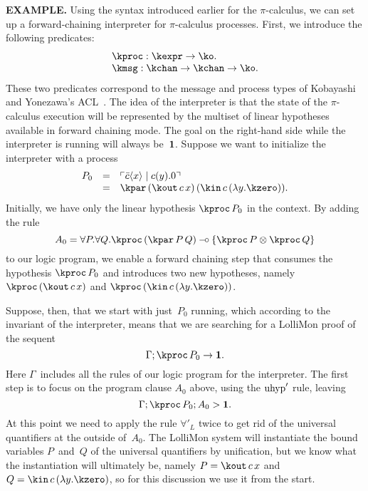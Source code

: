 \documentclass{sig-alt}
\begin{document}

\textbf{EXAMPLE.}\enspace 
Using the syntax introduced earlier for the $\pi$-calculus, we can set
up a forward-chaining interpreter for $\pi$-calculus processes.
First, we introduce the following predicates:
$$
\begin{array}{l}
\kproc : \kexpr \to \ko. \\
\kmsg : \kchan \to \kchan \to \ko. \\
\end{array}
$$
These two predicates correspond to the message and process types of
Kobayashi and Yonezawa's ACL~\cite{Kobayashi94tr}.
The idea of the interpreter is that the state of the $\pi$-calculus
execution will be represented by the multiset of linear hypotheses
available in forward chaining mode.
The goal on the right-hand side while the interpreter is running will
always be~$\textbf{1}$.
Suppose we want to initialize
the interpreter with a process
$$
\begin{array}{rll}
  P_0 &=& \rep{\pout{c}{x} \mid \pin{c}{y}.0} \\
      &=& \kpar\,(\kout\,c\,x)\,(\kin\,c\,(\lambda y.\kzero)). \\
\end{array}
$$
Initially, we have only the linear hypothesis $\kproc\,P_0$ in
the context.  By adding the rule
$$
  A_0 = \forall P.\forall Q.\kproc\,(\kpar\,P\,Q) \limp \{\kproc\,P \tensor \kproc\,Q\}
$$
to our logic program, we enable a forward chaining step that consumes
the hypothesis $\kproc\,P_0$ and introduces two new hypotheses, namely
$\kproc\,(\kout\,c\,x)$ and $\kproc\,(\kin\,c\,(\lambda y.\kzero))$.

Suppose, then, that we start with just~$P_0$ running, which according
to the invariant of the interpreter, means that we are searching for
a LolliMon proof of the sequent
$$
  \CLFLseq{\Gamma}{\kproc\,P_0}{\one}.
$$
Here $\Gamma$~includes all the rules of our logic program for the
interpreter.
The first step is to focus on the program clause $A_0$ above,
using the $\hbox{uhyp}'$ rule, leaving
$$
  \CLFLLFseq{\Gamma}{\kproc\,P_0}{A_0}{\one}.
$$
At this point we need to apply the rule $\forall'_L$ twice to get
rid of the universal quantifiers at the outside of~$A_0$.  The LolliMon
system will instantiate the bound variables $P$~and~$Q$ of the universal
quantifiers by unification, but we know what the
instantiation will ultimately be, namely $P=\kout\,c\,x$ and
$Q=\kin\,c\,(\lambda y.\kzero)$, so for this discussion we use it from the start.
\end{document}
